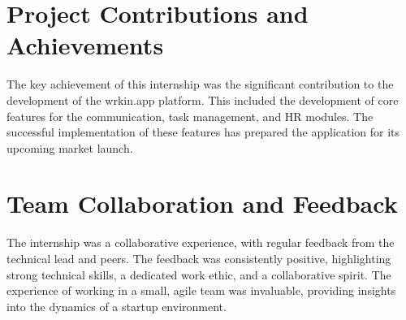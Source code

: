 \section{Project Contributions and Achievements}
The key achievement of this internship was the significant contribution to the development of the wrkin.app platform. This included the development of core features for the communication, task management, and HR modules. The successful implementation of these features has prepared the application for its upcoming market launch.

\section{Team Collaboration and Feedback}
The internship was a collaborative experience, with regular feedback from the technical lead and peers. The feedback was consistently positive, highlighting strong technical skills, a dedicated work ethic, and a collaborative spirit. The experience of working in a small, agile team was invaluable, providing insights into the dynamics of a startup environment.